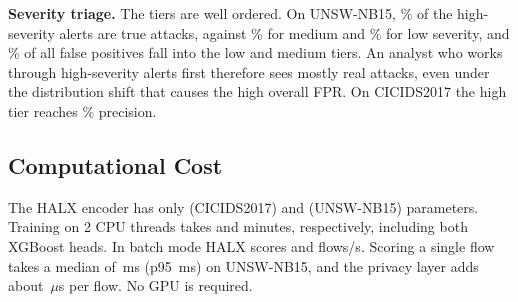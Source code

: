 \textbf{Severity triage.} The tiers are well ordered. On UNSW-NB15,
\unswsevhigh\% of the \unswsevnhigh{} high-severity alerts are true attacks,
against \unswsevmedium\% for medium and \unswsevlow\% for low
severity, and \unswfpsharelowmedium\% of all false positives fall into the
low and medium tiers. An analyst who works through high-severity alerts
first therefore sees mostly real attacks, even under the distribution shift
that causes the high overall FPR. On CICIDS2017 the high tier reaches
\cicsevhigh\% precision.

\subsection{Computational Cost}
The HALX encoder has only \cicparams{} (CICIDS2017) and \unswparams{}
(UNSW-NB15) parameters. Training on 2 CPU threads takes \cicHALXtime{} and
\unswHALXtime{} minutes, respectively, including both XGBoost heads. In batch
mode HALX scores \cicthru{} and \unswthru{} flows/s. Scoring a single flow
takes a median of \unswlatmed\,ms (p95 \unswlatpn\,ms) on UNSW-NB15, and the
privacy layer adds about \unswprivus\,$\mu$s per flow. No GPU is
required.
